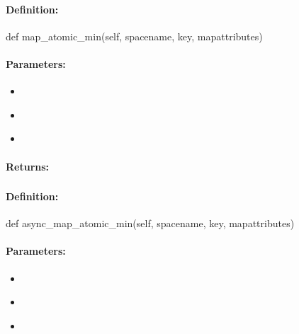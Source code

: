 \paragraph{Definition:}
\begin{pythoncode}
def map_atomic_min(self, spacename, key, mapattributes)
\end{pythoncode}

\paragraph{Parameters:}
\begin{itemize}[noitemsep]
\item {}\\

\item {}\\

\item {}\\

\end{itemize}

\paragraph{Returns:}


\pagebreak
\subsubsection{}
\label{api:python:async_map_atomic_min}


\paragraph{Definition:}
\begin{pythoncode}
def async_map_atomic_min(self, spacename, key, mapattributes)
\end{pythoncode}

\paragraph{Parameters:}
\begin{itemize}[noitemsep]
\item {}\\

\item {}\\

\item {}\\

\end{itemize}

